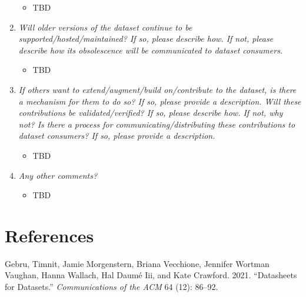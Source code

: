 \documentclass[
  letterpaper,
  DIV=11,
  numbers=noendperiod]{scrartcl}
\providecommand{\tightlist}{%
  \setlength{\itemsep}{0pt}\setlength{\parskip}{0pt}}\usepackage{longtable,booktabs,array}
\newlength{\cslhangindent}
\newenvironment{CSLReferences}[2] %
 {\begin{list}{}{%
  \setlength{\itemindent}{0pt}
  \setlength{\leftmargin}{0pt}
  \setlength{\parsep}{0pt}
  \ifodd #1
   \setlength{\leftmargin}{\cslhangindent}
   \setlength{\itemindent}{-1\cslhangindent}
  \fi
  \setlength{\itemsep}{#2\baselineskip}}}
 {\end{list}}
\begin{document}
\begin{enumerate}
  \begin{itemize}
  \tightlist
  \item
    TBD
  \end{itemize}
\item
  \emph{Will older versions of the dataset continue to be
  supported/hosted/maintained? If so, please describe how. If not,
  please describe how its obsolescence will be communicated to dataset
  consumers.}

  \begin{itemize}
  \tightlist
  \item
    TBD
  \end{itemize}
\item
  \emph{If others want to extend/augment/build on/contribute to the
  dataset, is there a mechanism for them to do so? If so, please provide
  a description. Will these contributions be validated/verified? If so,
  please describe how. If not, why not? Is there a process for
  communicating/distributing these contributions to dataset consumers?
  If so, please provide a description.}

  \begin{itemize}
  \tightlist
  \item
    TBD
  \end{itemize}
\item
  \emph{Any other comments?}

  \begin{itemize}
  \tightlist
  \item
    TBD
  \end{itemize}
\end{enumerate}

\newpage

\section*{References}\label{references}

\label{refs}
\begin{CSLReferences}{1}{0}
Gebru, Timnit, Jamie Morgenstern, Briana Vecchione, Jennifer Wortman
Vaughan, Hanna Wallach, Hal Daumé Iii, and Kate Crawford. 2021.
{``Datasheets for Datasets.''} \emph{Communications of the ACM} 64 (12):
86--92.

\end{CSLReferences}
\end{document}
